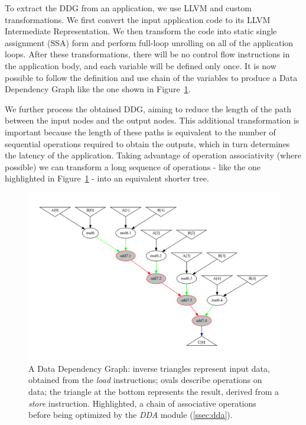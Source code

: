 To extract the DDG from an application, we use LLVM  and custom transformations. We first convert the input application code to its LLVM Intermediate Representation. We then transform the code into static single assignment (SSA) form and perform full-loop unrolling on all of the application loops. After these transformations, there will be no control flow instructions in the application body, and each variable will be defined only once. It is now possible to follow the definition and use chain of the variables to produce a Data Dependency Graph like the one shown in Figure~\ref{fig:ddg}. 

We further process the obtained DDG, aiming to reduce the length of the path between the input nodes and the output nodes. This additional transformation is important because the length of these paths is equivalent to the number of sequential operations required to obtain the outputs, which in turn determines the latency of the application. Taking advantage of operation associativity (where possible) we can transform a long sequence of operations - like the one highlighted in Figure~\ref{fig:ddg} - into an equivalent shorter tree.

\begin{figure}[tb] 
\centering
\includegraphics[width=.9\columnwidth,left]{images/supernode_2.pdf}
\caption{\small A Data Dependency Graph: inverse triangles represent input data, obtained from the \textit{load} instructions; ovals describe operations on data; the triangle at the bottom represents the result, derived from a \textit{store} instruction. Highlighted, a chain of associative operations before being optimized by the \textit{DDA} module (\ref{ssec:dda}).}
\label{fig:ddg}
\end{figure}


